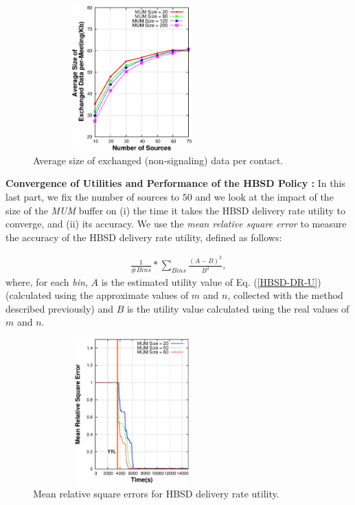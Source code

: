 \begin{figure}[!h]
\centering
\includegraphics[width=3in,height=2.2in]{Chapitre3/fig8.eps}
\caption{Average size of exchanged (non-signaling) data per contact.}
\label{PMED}
\end{figure}

\textbf{Convergence of Utilities and Performance of the HBSD Policy :} In this last part, we fix the number of sources to $50$ and we look at the impact of the size of the \emph{MUM} buffer on (i) the time it takes the HBSD delivery rate utility to converge, and (ii) its accuracy. We use the \emph{mean relative square error} to measure the accuracy of the HBSD delivery rate utility, defined as follows:

\begin{eqnarray*}
\frac{1}{\# Bins}* \sum_{Bins}^{}\frac{(A-B)^2}{B^2},
\end{eqnarray*}
where, for each \emph{bin}, $A$ is the estimated utility value of Eq. (\ref{HBSD-DR-U}) (calculated using the approximate values of $m$ and $n$, collected with the method described previously) and $B$ is the utility value calculated using the real values of $m$ and $n$.

\begin{figure}[!h]
\centering
\includegraphics[width=3in,height=2.2in]{Chapitre3/fig9.eps}
\caption{Mean relative square errors for HBSD delivery rate utility.}
\label{DR-RE}
\end{figure}

